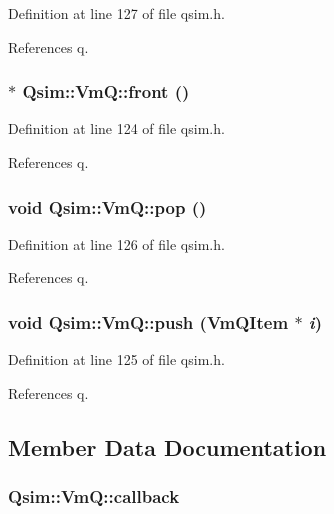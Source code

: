 Definition at line 127 of file qsim.h.

References q.
\subsubsection[{front}]{$\ast$ Qsim::VmQ::front ()\hspace{0.3cm}{\tt  [inline]}}\label{classQsim_1_1VmQ_089c354c8daf95d56e7af7ce58c81a17}




Definition at line 124 of file qsim.h.

References q.
\subsubsection[{pop}]{\setlength{\rightskip}{0pt plus 5cm}void Qsim::VmQ::pop ()\hspace{0.3cm}{\tt  [inline]}}\label{classQsim_1_1VmQ_97cb4cc44ef2bdebe184ab4273936714}




Definition at line 126 of file qsim.h.

References q.
\subsubsection[{push}]{\setlength{\rightskip}{0pt plus 5cm}void Qsim::VmQ::push ({\bf VmQItem} $\ast$ {\em i})\hspace{0.3cm}{\tt  [inline]}}\label{classQsim_1_1VmQ_024c94a0970fdc29ac670b140541e545}




Definition at line 125 of file qsim.h.

References q.

\subsection{Member Data Documentation}
\subsubsection[{callback}]{ {\bf Qsim::VmQ::callback}\hspace{0.3cm}{\tt  [private]}}\label{classQsim_1_1VmQ_ff34fcfcd76a885e581a7c46d4b03b1b}




